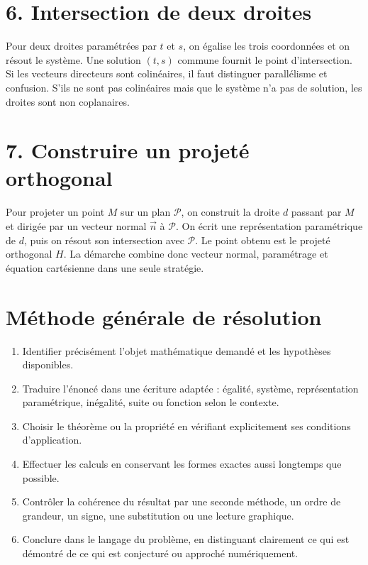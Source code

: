 \section{6. Intersection de deux droites}
Pour deux droites paramétrées par $t$ et $s$, on égalise les trois coordonnées et on résout le système. Une solution $(t,s)$ commune fournit le point d'intersection. Si les vecteurs directeurs sont colinéaires, il faut distinguer parallélisme et confusion. S'ils ne sont pas colinéaires mais que le système n'a pas de solution, les droites sont non coplanaires.

\section{7. Construire un projeté orthogonal}
Pour projeter un point $M$ sur un plan $\mathcal P$, on construit la droite $d$ passant par $M$ et dirigée par un vecteur normal $\vec n$ à $\mathcal P$. On écrit une représentation paramétrique de $d$, puis on résout son intersection avec $\mathcal P$. Le point obtenu est le projeté orthogonal $H$. La démarche combine donc vecteur normal, paramétrage et équation cartésienne dans une seule stratégie.


\section{Méthode générale de résolution}
\begin{methode}
\begin{enumerate}
\item Identifier précisément l'objet mathématique demandé et les hypothèses disponibles.
\item Traduire l'énoncé dans une écriture adaptée : égalité, système, représentation paramétrique, inégalité, suite ou fonction selon le contexte.
\item Choisir le théorème ou la propriété en vérifiant explicitement ses conditions d'application.
\item Effectuer les calculs en conservant les formes exactes aussi longtemps que possible.
\item Contrôler la cohérence du résultat par une seconde méthode, un ordre de grandeur, un signe, une substitution ou une lecture graphique.
\item Conclure dans le langage du problème, en distinguant clairement ce qui est démontré de ce qui est conjecturé ou approché numériquement.
\end{enumerate}
\end{methode}

